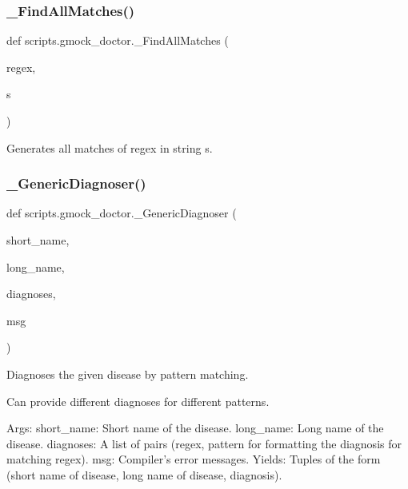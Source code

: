 \subsubsection{\texorpdfstring{\_FindAllMatches()}{\_FindAllMatches()}}
{\footnotesize\ttfamily def scripts.\+gmock\+\_\+doctor.\+\_\+\+Find\+All\+Matches (\begin{DoxyParamCaption}\item[{}]{regex,  }\item[{}]{s }\end{DoxyParamCaption})\hspace{0.3cm}{\ttfamily [private]}}

\begin{DoxyVerb}Generates all matches of regex in string s.\end{DoxyVerb}
 \mbox{\label{namespacescripts_1_1gmock__doctor_a54b9fcec8897c51a3b59d511bcf9776c}} 
\subsubsection{\texorpdfstring{\_GenericDiagnoser()}{\_GenericDiagnoser()}}
{\footnotesize\ttfamily def scripts.\+gmock\+\_\+doctor.\+\_\+\+Generic\+Diagnoser (\begin{DoxyParamCaption}\item[{}]{short\+\_\+name,  }\item[{}]{long\+\_\+name,  }\item[{}]{diagnoses,  }\item[{}]{msg }\end{DoxyParamCaption})\hspace{0.3cm}{\ttfamily [private]}}

\begin{DoxyVerb}Diagnoses the given disease by pattern matching.

Can provide different diagnoses for different patterns.

Args:
  short_name: Short name of the disease.
  long_name:  Long name of the disease.
  diagnoses:  A list of pairs (regex, pattern for formatting the diagnosis
              for matching regex).
  msg:        Compiler's error messages.
Yields:
  Tuples of the form
    (short name of disease, long name of disease, diagnosis).
\end{DoxyVerb}
 \mbox{\label{namespacescripts_1_1gmock__doctor_a2c19af7093263cceceb841c51caff9dd}} 
